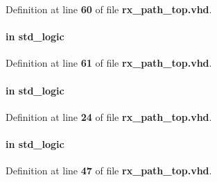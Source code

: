 Definition at line {\bf 60} of file {\bf rx\+\_\+path\+\_\+top.\+vhd}.

\paragraph[{chirp\+\_\+sync\+\_\+trig}]{ {\bfseries \textcolor{keywordflow}{in}\textcolor{vhdlchar}{ }} {\bfseries \textcolor{comment}{std\+\_\+logic}\textcolor{vhdlchar}{ }} \hspace{0.3cm}{\ttfamily [Port]}}\label{classrx__path__top_ae249f7fa1e7b628c16cc1e8d4cfc7089}


Definition at line {\bf 61} of file {\bf rx\+\_\+path\+\_\+top.\+vhd}.

\paragraph[{clk}]{ {\bfseries \textcolor{keywordflow}{in}\textcolor{vhdlchar}{ }} {\bfseries \textcolor{comment}{std\+\_\+logic}\textcolor{vhdlchar}{ }} \hspace{0.3cm}{\ttfamily [Port]}}\label{classrx__path__top_a4a4609c199d30b3adebbeb3a01276ec5}


Definition at line {\bf 24} of file {\bf rx\+\_\+path\+\_\+top.\+vhd}.

\paragraph[{clr\+\_\+smpl\+\_\+nr}]{ {\bfseries \textcolor{keywordflow}{in}\textcolor{vhdlchar}{ }} {\bfseries \textcolor{comment}{std\+\_\+logic}\textcolor{vhdlchar}{ }} \hspace{0.3cm}{\ttfamily [Port]}}\label{classrx__path__top_a7dc04539ef5d77088c29f5be14be5a27}


Definition at line {\bf 47} of file {\bf rx\+\_\+path\+\_\+top.\+vhd}.

